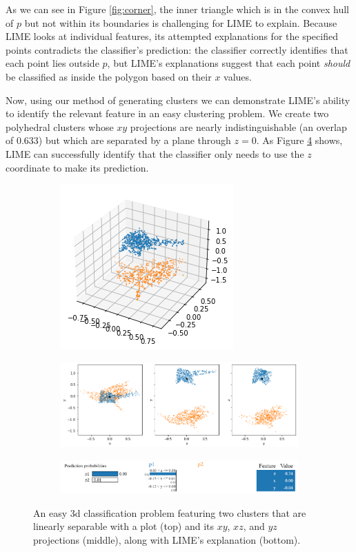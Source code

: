 \documentclass[manuscript,screen,review]{acmart}
\begin{document}
As we can see in Figure \ref{fig:corner}, the inner triangle which is in the convex hull of $p$ but not within its boundaries is challenging for LIME to explain. Because LIME looks at individual features, its attempted explanations for the specified points contradicts the classifier's prediction: the classifier correctly identifies that each point lies outside $p$, but LIME's explanations suggest that each point \emph{should} be classified as inside the polygon based on their $x$ values.

Now, using our method of generating clusters we can demonstrate LIME's ability to identify the relevant feature in an easy clustering problem.
We create two polyhedral clusters whose $xy$ projections are nearly indistinguishable (an overlap of 0.633) but
which are separated by a plane through $z=0$. As Figure \ref{fig:3d_easy} shows, LIME can successfully identify
that the classifier only needs to use the $z$ coordinate to make its prediction.

\begin{figure}[ht]
    \centering
    \begin{subfigure}
        \centering
        \includegraphics[width=.3\textwidth]{images/lime-3d-plot.png}
        \label{easy-3d}
    \end{subfigure}
    
    \begin{subfigure}
        \centering
        \includegraphics[width=.8\textwidth]{images/lime-3d-projs.png}
        \label{easy-3d-projs}
    \end{subfigure}
    
    \begin{subfigure}
        \centering
        \includegraphics[width=.8\textwidth]{images/lime-3d-expl.png}
        \label{lime-easy}
    \end{subfigure}
    
    \caption{An easy 3d classification problem featuring two clusters that are linearly separable with a plot
    (top) and its $xy$, $xz$, and $yz$ projections (middle), along with LIME's explanation (bottom).}
    \label{fig:3d_easy}
\end{figure}
\end{document}
